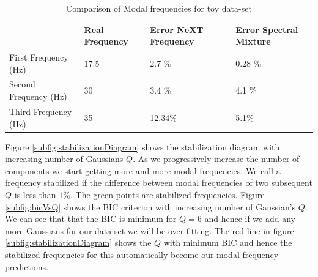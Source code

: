 \renewcommand{\arraystretch}{1}
\begin{table}[!ht]
    \centering
\begin{tabular}{|l|l|l|l|}
  \hline
   & Real Frequency & Error NeXT Frequency & Error Spectral Mixture\\
  \hline 
  \hline
First Frequency (Hz) & 17.5 & 2.7 \% & 0.28 \%\\
Second Frequency (Hz)  & 30 & 3.4 \% & 4.1 \%\\
Third Frequency (Hz) & 35 & 12.34\% & 5.1\%\\
   \hline
\end{tabular}
\caption{Comparison of Modal frequencies for toy data-set}
  \label{tabComparisonOfModalFrequenciesToyData}
\end{table}

Figure \ref{subfig:stabilizationDiagram} shows the stabilization diagram with increasing number of Gaussians $Q$. As we progressively increase the number of components we start getting more and more modal frequencies. We call a frequency stabilized if the difference between modal frequencies of two subsequent $Q$ is less than $1\%$. The green points are stabilized frequencies. Figure \ref{subfig:bicVsQ} shows the BIC criterion with increasing number of Gaussian's $Q$. We can see that that the BIC is minimum for $Q=6$ and hence if we add any more Gaussians for our data-set we will be over-fitting. The red line in figure \ref{subfig:stabilizationDiagram} shows the $Q$ with minimum BIC and hence the stabilized frequencies for this automatically become our modal frequency predictions.

